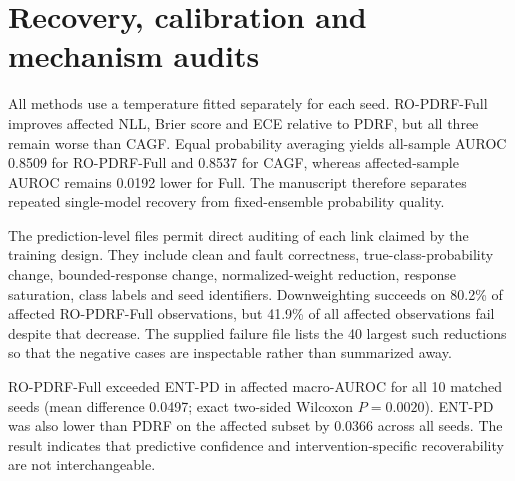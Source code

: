 \documentclass[10pt]{article}
\begin{document}
\section{Recovery, calibration and mechanism audits}

All methods use a temperature fitted separately for each seed. RO-PDRF-Full improves affected NLL, Brier score and ECE relative to PDRF, but all three remain worse than CAGF. Equal probability averaging yields all-sample AUROC 0.8509 for RO-PDRF-Full and 0.8537 for CAGF, whereas affected-sample AUROC remains 0.0192 lower for Full. The manuscript therefore separates repeated single-model recovery from fixed-ensemble probability quality.

The prediction-level files permit direct auditing of each link claimed by the training design. They include clean and fault correctness, true-class-probability change, bounded-response change, normalized-weight reduction, response saturation, class labels and seed identifiers. Downweighting succeeds on 80.2\% of affected RO-PDRF-Full observations, but 41.9\% of all affected observations fail despite that decrease. The supplied failure file lists the 40 largest such reductions so that the negative cases are inspectable rather than summarized away.

\begin{table}[H]
\centering
\caption{Paired conditional recovery and error-transfer audit across five fitted RO-PDRF-Full models and eight method-shared fault realizations. The clean-teacher state is taken from the actual Full-model clean forward pass; the baseline state is ordinary PDRF under the matched fault. Rows are repeated predictions from one instrument and are not independent devices.}
\label{tab:supp-teacher-conditional}
\resizebox{0.94\textwidth}{!}{}
\end{table}

\begin{table}[H]
\centering
\caption{Modern uncertainty-weighted comparator under the fixed chemical-array fault. ENT-PD uses normalized per-group predictive entropy for positive fusion weights and otherwise receives the same paired-degradation protocol. Values are means across 10 matched seeds.}
\label{tab:supp-entropy}
\resizebox{\textwidth}{!}{}
\end{table}

RO-PDRF-Full exceeded ENT-PD in affected macro-AUROC for all 10 matched seeds (mean difference 0.0497; exact two-sided Wilcoxon $P=0.0020$). ENT-PD was also lower than PDRF on the affected subset by 0.0366 across all seeds. The result indicates that predictive confidence and intervention-specific recoverability are not interchangeable.
\end{document}
